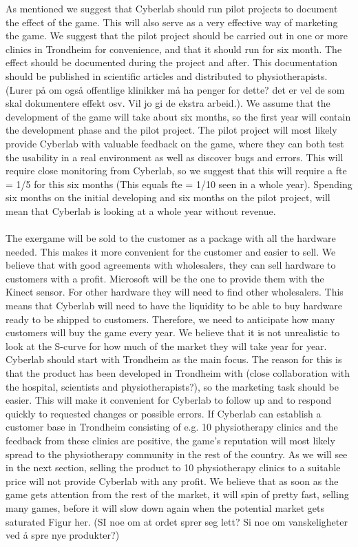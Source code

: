 As mentioned we suggest that Cyberlab should run pilot projects to document the effect of the game. This will also serve as a very effective way of marketing the game. We suggest that the pilot project should be carried out in one or more clinics in Trondheim for convenience, and that it should run for six month. The effect should be documented during the project and after. This documentation should be published in scientific articles and distributed to physiotherapists. (Lurer på om også offentlige klinikker må ha penger for dette? det er vel de som skal dokumentere effekt osv. Vil jo gi de ekstra arbeid.). We assume that the development of the game will take about six months, so the first year will contain the development phase and the pilot project. The pilot project will most likely provide Cyberlab with valuable feedback on the game, where they can both test the usability in a real environment as well as discover bugs and errors. This will require close monitoring from Cyberlab, so we suggest that this will require a \ac{fte} = 1/5 for this six months (This equals \ac{fte} = 1/10 seen in a whole year). Spending six months on the initial developing and six months on the pilot project, will mean that Cyberlab is looking at a whole year without revenue. \\ \\
The exergame will be sold to the customer as a package with all the hardware needed. This makes it more convenient for the customer and easier to sell. We believe that with good agreements with wholesalers, they can sell hardware to customers with a profit. Microsoft will be the one to provide them with the Kinect sensor. For other hardware they will need to find other wholesalers. This means that Cyberlab will need to have the liquidity to be able to buy hardware ready to be shipped to customers. Therefore, we need to anticipate how many customers will buy the game every year. We believe that it is not unrealistic to look at the S-curve for how much of the market they will take year for year. Cyberlab should start with Trondheim as the main focus. The reason for this is that the product has been developed in Trondheim with (close collaboration with the hospital, scientists and physiotherapists?), so the marketing task should be easier. This will make it convenient for Cyberlab to follow up and to respond quickly to requested changes or possible errors.  If Cyberlab can establish a customer base in Trondheim consisting of e.g. 10 physiotherapy clinics and the feedback from these clinics are positive, the game’s reputation will most likely spread to the physiotherapy community in the rest of the country. As we will see in the next section, selling the product to 10 physiotherapy clinics to a suitable price will not provide Cyberlab with any profit. We believe that as soon as the game gets attention from the rest of the market, it will spin of pretty fast, selling many games, before it will slow down again when the potential market gets saturated Figur her.  (SI noe om at ordet sprer seg lett? Si noe om vanskeligheter ved {å} spre nye produkter?)\\ \\
